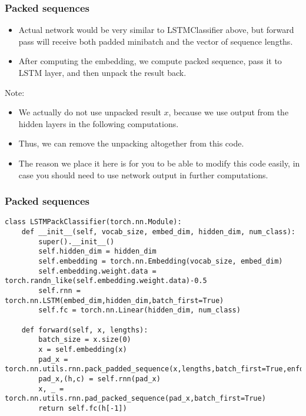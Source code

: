 \begin{frame}[fragile] \frametitle{Packed sequences}

\begin{itemize}
\item  Actual network would be very similar to LSTMClassifier above, but forward pass will receive both padded minibatch and the vector of sequence lengths. 
\item After computing the embedding, we compute packed sequence, pass it to LSTM layer, and then unpack the result back.
\end{itemize}

Note:
\begin{itemize}
\item   We actually do not use unpacked result $x$, because we use output from the hidden layers in the following computations. 
\item Thus, we can remove the unpacking altogether from this code. 
\item The reason we place it here is for you to be able to modify this code easily, in case you should need to use network output in further computations.
\end{itemize}

\end{frame}

\begin{frame}[fragile] \frametitle{Packed sequences}



\begin{lstlisting}
class LSTMPackClassifier(torch.nn.Module):
    def __init__(self, vocab_size, embed_dim, hidden_dim, num_class):
        super().__init__()
        self.hidden_dim = hidden_dim
        self.embedding = torch.nn.Embedding(vocab_size, embed_dim)
        self.embedding.weight.data = torch.randn_like(self.embedding.weight.data)-0.5
        self.rnn = torch.nn.LSTM(embed_dim,hidden_dim,batch_first=True)
        self.fc = torch.nn.Linear(hidden_dim, num_class)

    def forward(self, x, lengths):
        batch_size = x.size(0)
        x = self.embedding(x)
        pad_x = torch.nn.utils.rnn.pack_padded_sequence(x,lengths,batch_first=True,enforce_sorted=False)
        pad_x,(h,c) = self.rnn(pad_x)
        x, _ = torch.nn.utils.rnn.pad_packed_sequence(pad_x,batch_first=True)
        return self.fc(h[-1])
\end{lstlisting}

\end{frame}

